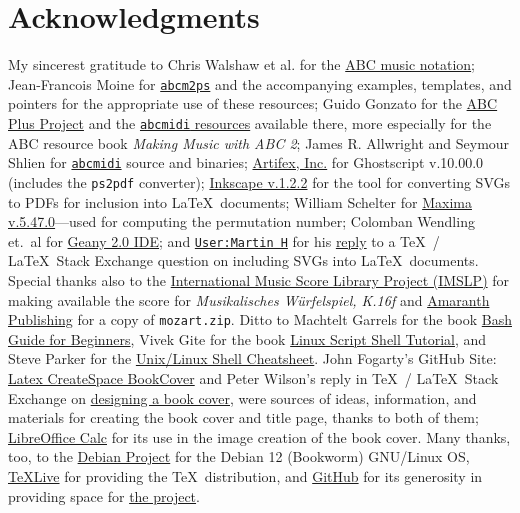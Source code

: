 \documentclass[letterpaper,x11names,svgnames,10pt]{article}
\begin{document}
\section{Acknowledgments}
My sincerest gratitude to Chris Walshaw et al. for the \href{http://www.abcnotation.com/}{ABC music notation}; Jean-Francois Moine for \href{http://moinejf.free.fr/}{\tt abcm2ps} and the accompanying examples, templates, and pointers for the appropriate use of these resources; Guido Gonzato for the \href{http://abcplus.sourceforge.net/}{ABC Plus Project} and the \href{http://abcplus.sourceforge.net/#abcMIDI}{{\tt abcmidi} resources} available there, more especially for the ABC resource book {\em Making Music with ABC 2}; James R. Allwright and Seymour Shlien for \href{http://abc.sourceforge.net/abcMIDI}{\tt abcmidi} source and binaries; \href{https://artifex.com/}{Artifex, Inc.} for Ghostscript v.10.00.0 (includes the {\tt ps2pdf} converter); \href{https://www.inkscape.org/}{Inkscape v.1.2.2} for the tool for converting SVGs to PDFs for inclusion into \LaTeX\ documents; William Schelter for \href{https://maxima.sourceforge.io}{Maxima v.5.47.0}---used for computing the permutation number; Colomban Wendling et.\ al for \href{https://www.geany.org}{Geany 2.0 IDE}; and \href{https://tex.stackexchange.com/users/632/martin-h}{\tt User:Martin H} for his \href{https://tex.stackexchange.com/questions/2099/how-to-include-svg-diagrams-in-latex}{reply} to a \TeX\ / \LaTeX\ Stack Exchange question on including SVGs into \LaTeX\ documents. Special thanks also to the \href{http://imslp.org/}{International Music Score Library Project (IMSLP)} for making available the score for {\em Musikalisches W\"{u}rfelspiel, K.\516f} and \href{http://www.amaranthpublishing.com/MozartDiceGame.htm}{Amaranth Publishing} for a copy of {\tt mozart.zip}. Ditto to Machtelt Garrels for the book \href{http://tldp.org/LDP/Bash-Beginners-Guide/html/Bash-Beginners-Guide.html}{Bash Guide for Beginners}, Vivek Gite for the book \href{http://www.freeos.com/guides/lsst/}{Linux Script Shell Tutorial}, and Steve Parker for the \href{http://steve-parker.org/sh/cheatsheet.pdf}{Unix/Linux Shell Cheatsheet}. John Fogarty's GitHub Site: \href{https://github.com/jfogarty/latex-createspace-bookcover}{Latex CreateSpace BookCover} and Peter Wilson's reply in \TeX\ / \LaTeX\ Stack Exchange on \href{https://tex.stackexchange.com/questions/17579/how-can-i-design-a-book-cover}{designing a book cover}, were sources of ideas, information, and materials for creating the book cover and title page, thanks to both of them; \href{http://www.libreoffice.org/}{LibreOffice Calc} for its use in the image creation of the book cover.  Many thanks, too, to the \href{https://www.debian.org}{Debian Project} for the Debian 12 (Bookworm) GNU/Linux OS, \href{http://www.tug.org/texlive/}{TeXLive} for providing the \TeX\ distribution,  and \href{https://github.com}{GitHub} for its generosity in providing space for \href{https://github.com/justineuro/mdgBookSVGKit}{the project}.  
\end{document}
